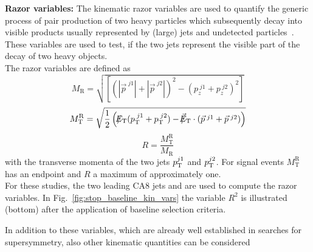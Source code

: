 \begin{description}
 \item \textbf{Razor variables:} The kinematic razor variables are used to quantify the generic process of pair production of two heavy particles which subsequently decay into visible products usually represented by (large) jets and undetected particles~\cite{Chatrchyan:2012uea, Chatrchyan:2014goa, CMS-PAS-SUS-14-011}. These variables are used to test, if the two jets represent the visible part of the decay of two heavy objects. \\
The razor variables are defined as
\begin{equation}
M_\mathrm{R} = \sqrt{\left[(|\vec{p}^{\; j1} | + |\vec{p}^{\; j2} |)^2 - (p_z^{\; j1}  + p_z^{\; j2} )^2 \right]}
\end{equation}
 \begin{equation}
M_\mathrm{T}^\mathrm{R} = \sqrt{\frac{1}{2} \left( \slash\mkern-12mu{E}_{\text{T}} (p_{\text{T}}^{\; j1}  + p_{\text{T}}^{\; j2} ) - \slash\mkern-12mu{\vec{E}}_{\text{T}} \cdot (\vec{p}^{\; j1} + \vec{p}^{\; j2}) \right) }
\end{equation}
\begin{equation}
R = \frac{M_\mathrm{T}^\mathrm{R}}{M_\mathrm{R}}
\end{equation}
with the transverse momenta of the two jets $p_{\text{T}}^{j1}$ and $p_{\text{T}}^{j2}$. For signal events $M_\mathrm{T}^\mathrm{R}$ has an endpoint and $R$ a maximum of approximately one. \\
For these studies, the two leading CA8 jets and \met are used to compute the razor variables. In Fig.~\ref{fig:stop_baseline_kin_vars} the variable $R^2$ is illustrated (bottom) after the application of baseline selection criteria. 
\end{description} 
In addition to these variables, which are already well established in searches for supersymmetry, also other kinematic quantities can be considered
